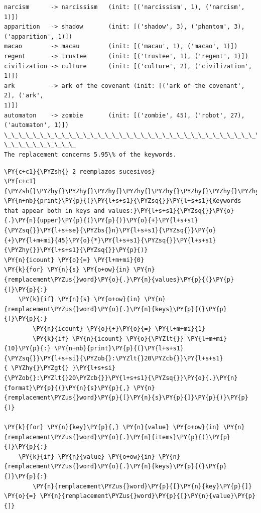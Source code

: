     \begin{Verbatim}[commandchars=\\\{\}]
narcism      -> narcissism   (init: [('narcissism', 1), ('narcism', 1)])
apparition   -> shadow       (init: [('shadow', 3), ('phantom', 3),
('apparition', 1)])
macao        -> macau        (init: [('macau', 1), ('macao', 1)])
regent       -> trustee      (init: [('trustee', 1), ('regent', 1)])
civilization -> culture      (init: [('culture', 2), ('civilization', 1)])
ark          -> ark of the covenant (init: [('ark of the covenant', 2), ('ark',
1)])
automaton    -> zombie       (init: [('zombie', 45), ('robot', 27),
('automaton', 1)])
\_\_\_\_\_\_\_\_\_\_\_\_\_\_\_\_\_\_\_\_\_\_\_\_\_\_\_\_\_\_\_\_\_\_\_\_\_\_\_\_\_\_\_\_\_\_\_\_\_\_\_\_\_\_\_\_\_\_\_\_\_\_\_\_\_\_\_\_\_\_\_\_\_\_\_\_\_\_\_\_
\_\_\_\_\_\_\_\_\_\_
The replacement concerns 5.95\% of the keywords.
\end{Verbatim}

    \begin{tcolorbox}[breakable, size=fbox, boxrule=1pt, pad at break*=1mm,colback=cellbackground, colframe=cellborder]
\begin{Verbatim}[commandchars=\\\{\}]
\PY{c+c1}{\PYZsh{} 2 reemplazos sucesivos}
\PY{c+c1}{\PYZsh{}\PYZhy{}\PYZhy{}\PYZhy{}\PYZhy{}\PYZhy{}\PYZhy{}\PYZhy{}\PYZhy{}\PYZhy{}\PYZhy{}\PYZhy{}\PYZhy{}\PYZhy{}\PYZhy{}\PYZhy{}\PYZhy{}\PYZhy{}\PYZhy{}\PYZhy{}\PYZhy{}\PYZhy{}\PYZhy{}\PYZhy{}\PYZhy{}\PYZhy{}\PYZhy{}\PYZhy{}}
\PY{n+nb}{print}\PY{p}{(}\PY{l+s+s1}{\PYZsq{}}\PY{l+s+s1}{Keywords that appear both in keys and values:}\PY{l+s+s1}{\PYZsq{}}\PY{o}{.}\PY{n}{upper}\PY{p}{(}\PY{p}{)}\PY{o}{+}\PY{l+s+s1}{\PYZsq{}}\PY{l+s+se}{\PYZbs{}n}\PY{l+s+s1}{\PYZsq{}}\PY{o}{+}\PY{l+m+mi}{45}\PY{o}{*}\PY{l+s+s1}{\PYZsq{}}\PY{l+s+s1}{\PYZhy{}}\PY{l+s+s1}{\PYZsq{}}\PY{p}{)}
\PY{n}{icount} \PY{o}{=} \PY{l+m+mi}{0}
\PY{k}{for} \PY{n}{s} \PY{o+ow}{in} \PY{n}{remplacement\PYZus{}word}\PY{o}{.}\PY{n}{values}\PY{p}{(}\PY{p}{)}\PY{p}{:}
    \PY{k}{if} \PY{n}{s} \PY{o+ow}{in} \PY{n}{remplacement\PYZus{}word}\PY{o}{.}\PY{n}{keys}\PY{p}{(}\PY{p}{)}\PY{p}{:}
        \PY{n}{icount} \PY{o}{+}\PY{o}{=} \PY{l+m+mi}{1}
        \PY{k}{if} \PY{n}{icount} \PY{o}{\PYZlt{}} \PY{l+m+mi}{10}\PY{p}{:} \PY{n+nb}{print}\PY{p}{(}\PY{l+s+s1}{\PYZsq{}}\PY{l+s+si}{\PYZob{}:\PYZlt{}20\PYZcb{}}\PY{l+s+s1}{ \PYZhy{}\PYZgt{} }\PY{l+s+si}{\PYZob{}:\PYZlt{}20\PYZcb{}}\PY{l+s+s1}{\PYZsq{}}\PY{o}{.}\PY{n}{format}\PY{p}{(}\PY{n}{s}\PY{p}{,} \PY{n}{remplacement\PYZus{}word}\PY{p}{[}\PY{n}{s}\PY{p}{]}\PY{p}{)}\PY{p}{)}

\PY{k}{for} \PY{n}{key}\PY{p}{,} \PY{n}{value} \PY{o+ow}{in} \PY{n}{remplacement\PYZus{}word}\PY{o}{.}\PY{n}{items}\PY{p}{(}\PY{p}{)}\PY{p}{:}
    \PY{k}{if} \PY{n}{value} \PY{o+ow}{in} \PY{n}{remplacement\PYZus{}word}\PY{o}{.}\PY{n}{keys}\PY{p}{(}\PY{p}{)}\PY{p}{:}
        \PY{n}{remplacement\PYZus{}word}\PY{p}{[}\PY{n}{key}\PY{p}{]} \PY{o}{=} \PY{n}{remplacement\PYZus{}word}\PY{p}{[}\PY{n}{value}\PY{p}{]}                    
\end{Verbatim}
\end{tcolorbox}

